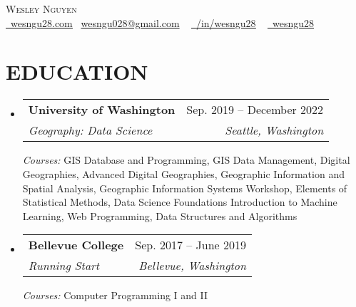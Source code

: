 \documentclass[letterpaper,11pt]{article}
\makeatletter
\newcommand{\resumeSubheading}[4]{
  \vspace{-2pt}\item
    \begin{tabular*}{0.97\textwidth}[t]{l@{\extracolsep{\fill}}r}
      \textbf{#1} & #2 \\
      \textit{\small#3} & \textit{\small #4} \\
    \end{tabular*}\vspace{-7pt}
}
\newcommand{\resumeSubHeadingListStart}{\begin{itemize}[leftmargin=0.15in, label={}]}
\newcommand{\resumeSubHeadingListEnd}{\end{itemize}}
\makeatother
\begin{document}

\begin{center}
    {\Huge \scshape Wesley Nguyen} \\ \vspace{1pt}\href{https://wesngu28.com}{\raisebox{-0.2\height}\faUser\ \underline{wesngu28.com}} {\raisebox{-0.2\height}\faEnvelope\  \underline{wesngu028@gmail.com}} ~
    \href{https://linkedin.com/in/wesngu28/}{\raisebox{-0.2\height}\faLinkedin\ \underline{/in/wesngu28}}  ~
    \href{https://github.com/wesngu28}{\raisebox{-0.2\height}\faGithub\ \underline{wesngu28}}
    \vspace{-8pt}
\end{center}


\section{EDUCATION}
  \resumeSubHeadingListStart
    \resumeSubheading
      {University of Washington}{Sep. 2019 -- December 2022}
      {Geography: Data Science}{Seattle, Washington}
      { \footnotesize{\newline{}\textit{{Courses:}} GIS Database and Programming, GIS Data Management, Digital Geographies, Advanced Digital Geographies, Geographic Information and Spatial Analysis, Geographic Information Systems Workshop, Elements of Statistical Methods, Data Science Foundations Introduction to Machine Learning, Web Programming, Data Structures and Algorithms }}
    \resumeSubheading
      {Bellevue College}{Sep. 2017 -- June 2019}
      {Running Start}{Bellevue, Washington}
      { \footnotesize{\newline{}\textit{{Courses:}} Computer Programming I and II }}
  \resumeSubHeadingListEnd
\end{document}
